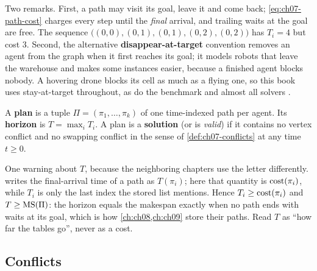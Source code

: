 Two remarks. First, a path may visit its goal, leave it and come back;
\cref{eq:ch07-path-cost} charges every step until the \emph{final} arrival,
and trailing waits at the goal are free. The sequence
$\bigl((0,0), (0,1), (0,1), (0,2), (0,2)\bigr)$ has $T_i = 4$ but cost $3$.
Second, the alternative \textbf{disappear-at-target}
convention removes an agent from the graph when it first reaches its goal; it
models robots that leave the warehouse and makes some instances easier,
because a finished agent blocks nobody. A hovering drone blocks its cell as
much as a flying one, so this book uses stay-at-target throughout, as do the
benchmark and almost all solvers \cite{stern2019mapf}.

\begin{definition}
\label{def:ch07-plan}
A \textbf{plan} is a tuple $\Pi = (\pi_1, \dots, \pi_k)$ of
one time-indexed path per agent. Its \textbf{horizon} is
$T = \max_i T_i$. A plan is a \textbf{solution} (or is
\emph{valid}) if it contains no vertex conflict and no swapping conflict in
the sense of \cref{def:ch07-conflicts} at any time $t \ge 0$.
\end{definition}

One warning about $T$, because the neighboring chapters use the letter
differently.  writes the final-arrival time of a path as
$T(\pi_i)$; here that quantity is $\operatorname{cost}(\pi_i)$, while $T_i$ is only the
last index the stored list mentions. Hence $T_i \ge \operatorname{cost}(\pi_i)$ and
$T \ge \mathrm{MS}(\Pi)$: the horizon equals the makespan exactly when no path
ends with waits at its goal, which is how \cref{ch:ch08,ch:ch09} store their
paths. Read $T$ as ``how far the tables go'', never as a cost.

\subsection{Conflicts}
\label{sec:ch07-conflicts}

